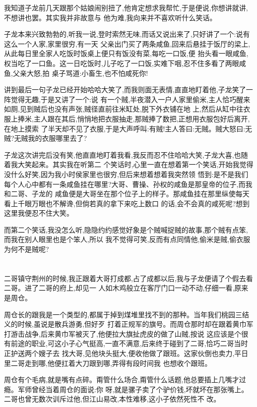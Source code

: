 ﻿\documentclass[12pt,twocolumn]{article}
\begin{document}
我知道子龙前几天跟那个姑娘闹别扭了,他肯定想求我帮忙,于是便说,你想讲就讲,不想讲也罢。其实我并非故意与
他为难,我向来并不喜欢听什么笑话。

子龙本来兴致勃勃的,听我一说,登时索然无味,而话又说出来了,只好讲了一个:说有这么一个人家,家里很穷,有一天
父亲出门买了两条咸鱼,回来后悬挂于饭厅的梁上,从此每日里全家人吃饭时饭桌上便只有饭没有菜,每吃一口饭,便
抬头看一眼咸鱼,权当吃了一口鱼。这一日吃饭时,儿子吃了一口饭,实难下咽,忍不住多看了两眼咸鱼,父亲大怒,拍
桌子骂道:小畜生,也不怕咸死你!

讲到最后一句子龙已经开始哈哈大笑了,而我则面无表情,直直地盯着他,子龙笑了一阵觉得无趣,于是又讲了一个:说
有一个贼,半夜潜入一户人家里偷米,主人恰巧醒来如厕,见到贼后也没有声张,贼径直前往米缸处,脱下外衣铺在地
上,然后从缸中往衣服上捧米,主人跟在其后,悄悄地把衣服抽走,那贼捧了数把,正想用衣服包好后离开,在地上摸索
了半天却不见了衣服,于是大声呼叫:有贼!主人答曰:无贼。贼大怒曰:无贼?无贼我的衣服哪里去了?

子龙这次讲完后没有笑,他直直地盯着我看,我反而忍不住哈哈大笑,子龙大喜,也随着我大笑起来。其实我在听第二
个笑话时,心里一直在想着第一个笑话,开始我觉得没什么好笑,因为我小时侯家里也很穷,但后来想着想着我突然领
悟到:是不是我们每个人心中都有一条咸鱼挂在哪里?大哥、曹操、孙权的咸鱼是那皇帝的位子,而我和二哥、子龙的
咸鱼便是大哥坐在那个位子上的样子。那咸鱼挂在那里纵使每天看上千眼万眼也不解谗,但倘若真的拿下来吃上数口
的话,会不会真的咸死呢?想到这里我便忍不住大笑。

而第二个笑话,我没怎么听,隐隐约约感觉好象是个贼喊捉贼的故事,那个贼有点笨,而我在别人眼里也是个笨人,所以
我不觉得可笑,反而有点同情他,偷米是贼,偷衣服为何不是贼呢?

\section{}

二哥镇守荆州的时候,我正跟着大哥打成都,占了成都以后,我与子龙便请了个假去看二哥。进了二哥的府上,却见一
人如木鸡般立在客厅门口一动不动,仔细一看,原来是周仓。

周仓长的跟我是一个类型的,都属于掉到煤堆里找不到的那种。当年我们桃园三结义的时候,虽说是散兵游勇,但好歹
打着正规军的旗号。而周仓那时却在跟着黄巾军打游击战争,后来黄巾军被灭了,他便拉大旗扯虎皮的做了山贼,按说
这应该是个很有前途的职业,可这小子心气挺高,一直不满意,后来终于碰到了二哥,恰巧二哥当时正护送两个嫂子去
找大哥,见他块头挺大,便收他做了跟班。这家伙倒也卖力,平日里二哥走到哪,他便扛着大刀跟到哪,弄得有段时间我
也想收个跟班。

周仓有个毛病,就是嘴有点碎。甭管什么场合,甭管什么话题,他总要插上几嘴才过瘾。军师曾经当着周仓的面说:你
呀,就是骡子卖了个驴价钱,坏就坏在那张嘴上。二哥也曾无数次训斥过他,但江山易改,本性难移,这小子依然死性不
改。
\end{document}
